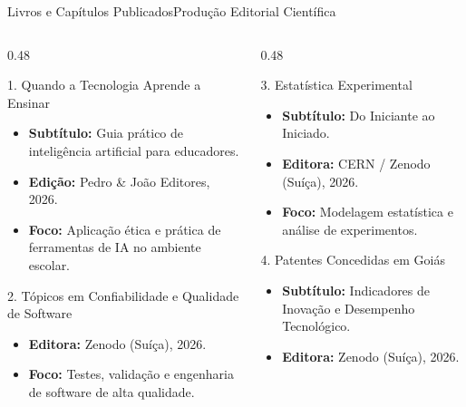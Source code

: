 \documentclass[9pt]{beamer}
\begin{document}
\begin{frame}{Livros e Capítulos Publicados}{Produção Editorial Científica}
  \begin{columns}[t]
    \begin{column}{0.48\textwidth}
      \begin{block}{1. Quando a Tecnologia Aprende a Ensinar}
        \begin{itemize}
          \item \textbf{Subtítulo:} Guia prático de inteligência artificial para educadores.
          \item \textbf{Edição:} Pedro \& João Editores, 2026.
          \item \textbf{Foco:} Aplicação ética e prática de ferramentas de IA no ambiente escolar.
        \end{itemize}
      \end{block}

      \begin{block}{2. Tópicos em Confiabilidade e Qualidade de Software}
        \begin{itemize}
          \item \textbf{Editora:} Zenodo (Suíça), 2026.
          \item \textbf{Foco:} Testes, validação e engenharia de software de alta qualidade.
        \end{itemize}
      \end{block}
    \end{column}

    \begin{column}{0.48\textwidth}
      \begin{block}{3. Estatística Experimental}
        \begin{itemize}
          \item \textbf{Subtítulo:} Do Iniciante ao Iniciado.
          \item \textbf{Editora:} CERN / Zenodo (Suíça), 2026.
          \item \textbf{Foco:} Modelagem estatística e análise de experimentos.
        \end{itemize}
      \end{block}

      \begin{block}{4. Patentes Concedidas em Goiás}
        \begin{itemize}
          \item \textbf{Subtítulo:} Indicadores de Inovação e Desempenho Tecnológico.
          \item \textbf{Editora:} Zenodo (Suíça), 2026.
        \end{itemize}
      \end{block}
    \end{column}
  \end{columns}
\end{frame}
\end{document}
